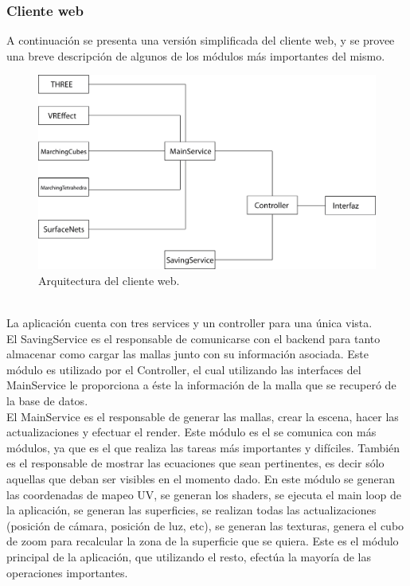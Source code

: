 \documentclass[12pt]{article}
\begin{document}
\subsubsection{Cliente web}
A continuación se presenta una versión simplificada del cliente web, y se provee una breve descripción de algunos de los módulos más importantes del mismo.\\
\begin{figure}[h]
\includegraphics[width=\textwidth]{arq_sim.png}
\caption{Arquitectura del cliente web.}
\end{figure}
\\La aplicación cuenta con tres services y un controller para una única vista. 
\\El SavingService es el responsable de comunicarse con el backend para tanto almacenar como cargar las mallas junto con su información asociada. Este módulo es utilizado por el Controller, el cual utilizando las interfaces del MainService le proporciona a éste la información de la malla que se recuperó de la base de datos.
\\El MainService es el responsable de generar las mallas, crear la escena, hacer las actualizaciones y efectuar el render. Este módulo es el se comunica con más módulos, ya que es el que realiza las tareas más importantes y difíciles. También es el responsable de mostrar las ecuaciones que sean pertinentes, es decir sólo aquellas que deban ser visibles en el momento dado. En este módulo se generan las coordenadas de mapeo UV, se generan los shaders, se ejecuta el main loop de la aplicación, se generan las superficies, se realizan todas las actualizaciones (posición de cámara, posición de luz, etc), se generan las texturas, genera el cubo de zoom para recalcular la zona de la superficie que se quiera. Este es el módulo principal de la aplicación, que utilizando el resto, efectúa la mayoría de las operaciones importantes.
\end{document}
